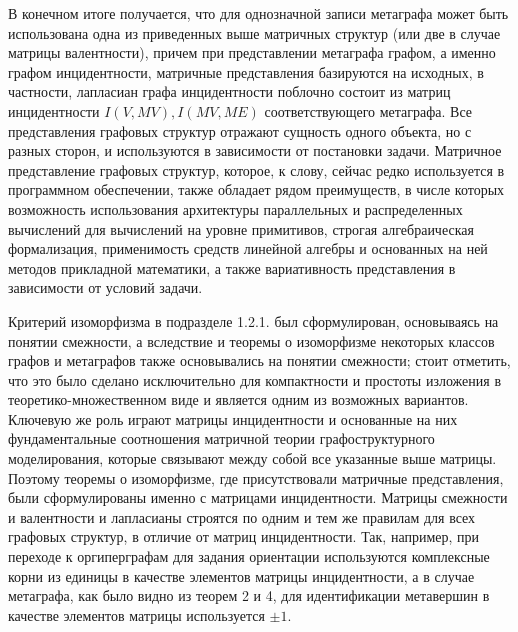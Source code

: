 В конечном итоге получается, что для однозначной записи метаграфа может быть использована одна из приведенных выше матричных структур (или две в случае матрицы валентности), причем при представлении метаграфа графом, а именно графом инцидентности, матричные представления базируются на исходных, в частности, лапласиан графа инцидентности поблочно состоит из матриц инцидентности $I(V,MV), I(MV, ME)$ соответствующего метаграфа. Все представления графовых структур отражают сущность одного объекта, но с разных сторон, и используются в зависимости от постановки задачи. Матричное представление графовых структур, которое, к слову, сейчас редко используется в программном обеспечении, также обладает рядом преимуществ, в числе которых возможность использования архитектуры параллельных и распределенных вычислений для вычислений на уровне примитивов, строгая алгебраическая формализация, применимость средств линейной алгебры и основанных на ней методов прикладной математики, а также вариативность представления в зависимости от условий задачи. 

Критерий изоморфизма в подразделе 1.2.1. был сформулирован, основываясь на понятии смежности, а вследствие и теоремы о изоморфизме некоторых классов графов и метаграфов также основывались на понятии смежности; стоит отметить, что это было сделано исключительно для компактности и простоты изложения в теоретико-множественном виде и является одним из возможных вариантов. Ключевую же роль играют матрицы инцидентности и основанные на них фундаментальные соотношения матричной теории графоструктурного моделирования, которые связывают между собой все указанные выше матрицы. Поэтому теоремы о изоморфизме, где присутствовали матричные представления, были сформулированы именно с матрицами инцидентности. Матрицы смежности и валентности и лапласианы строятся по одним и тем же правилам для всех графовых структур, в отличие от матриц инцидентности. Так, например, при переходе к оргиперграфам для задания ориентации используются комплексные корни из единицы в качестве элементов матрицы инцидентности, а в случае метаграфа, как было видно из теорем 2 и 4, для идентификации метавершин в качестве элементов матрицы используется $\pm 1$. 

